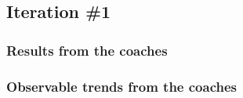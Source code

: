 \subsection{Iteration \#1}


    \subsubsection{Results from the coaches}

    \subsubsection{Observable trends from the coaches}
